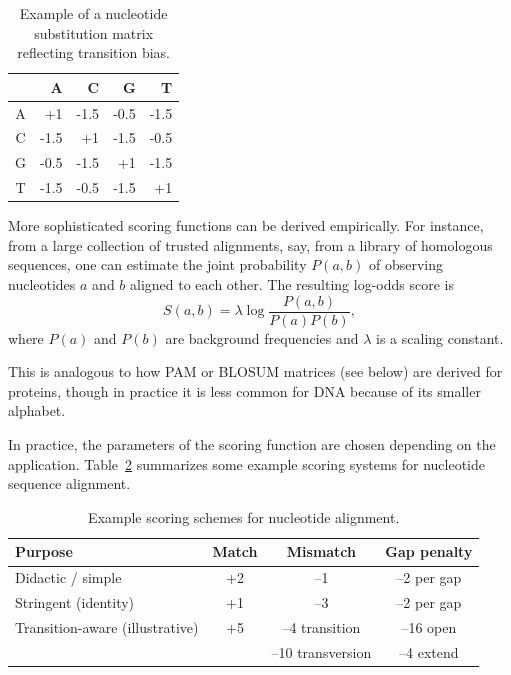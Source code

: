 \begin{table}[htbp]
\caption{Example of a nucleotide substitution matrix reflecting transition bias.}
\label{tab:nt_substitution_matrix}
\centering
\begin{tabular}{c|rrrr}
  & A & C & G & T \\
  \hline
  A & +1 & -1.5 & -0.5 & -1.5 \\
  C & -1.5 & +1 & -1.5 & -0.5 \\
  G & -0.5 & -1.5 & +1 & -1.5 \\
  T & -1.5 & -0.5 & -1.5 & +1 \\
\end{tabular}
\end{table}

More sophisticated scoring functions can be derived empirically.
For instance, from a large collection of trusted alignments, say, from a library of homologous sequences, one can estimate the joint probability $P(a,b)$ of observing nucleotides $a$ and $b$ aligned to each other.  The resulting log-odds score is
\begin{equation}
S(a,b) = \lambda \log \frac{P(a,b)}{P(a)P(b)},
\end{equation}
where $P(a)$ and $P(b)$ are background frequencies and $\lambda$ is a scaling constant.

This is analogous to how PAM or BLOSUM matrices (see below) are derived for proteins, though in practice it is less common for DNA because of its smaller alphabet.

In practice, the parameters of the scoring function are chosen depending on the application. Table~\ref{tab:typical_params} summarizes some example scoring systems for nucleotide sequence alignment.

\begin{table}[h]
\caption{Example scoring schemes for nucleotide alignment.}
\label{tab:typical_params}
\begin{tabular}{lccc}
\toprule
Purpose & Match & Mismatch & Gap penalty \\
\midrule
Didactic / simple & +2 & --1 & --2 per gap \\
Stringent (identity) & +1 & --3 & --2 per gap  \\
Transition-aware (illustrative) & +5 & --4 transition & --16 open \\
& & --10 transversion & --4 extend \\
\bottomrule
\end{tabular}
\end{table}

